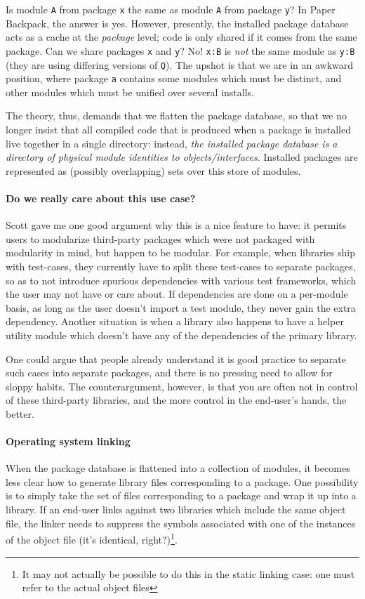 \documentclass{article}
\begin{document}
Is module \verb|A| from package \verb|x| the same as module \verb|A|
from package \verb|y|?  In Paper Backpack, the answer is yes.
However, presently, the installed package database acts as a cache at the \emph{package}
level; code is only shared if it comes from the same package.  Can we share
packages \verb|x| and \verb|y|? No!
\verb|x:B| is \emph{not} the same module as \verb|y:B| (they are using differing
versions of \verb|Q|).  The upshot is that we are in an awkward position,
where package \verb|a| contains some modules which must be distinct, and other
modules which must be unified over several installs.

The theory, thus, demands that we flatten the package database, so that
we no longer insist that all compiled code that is produced when a
package is installed live together in a single directory: instead,
\emph{the installed package database is a directory of physical module
identities to objects/interfaces}.  Installed packages are represented
as (possibly overlapping) sets over this store of modules.

\paragraph{Do we really care about this use case?}  Scott gave me one
good argument why this is a nice feature to have: it permits users to
modularize third-party packages which were not packaged with modularity
in mind, but happen to be modular.  For example, when libraries ship
with test-cases, they currently have to split these test-cases to separate
packages, so as to not introduce spurious dependencies with various
test frameworks, which the user may not have or care about.  If dependencies
are done on a per-module basis, as long as the user doesn't import a test
module, they never gain the extra dependency.  Another situation is when
a library also happens to have a helper utility module which doesn't have
any of the dependencies of the primary library.

One could argue that people already understand it is good practice to
separate such cases into separate packages, and there is no pressing
need to allow for sloppy habits.  The counterargument, however, is that
you are often not in control of these third-party libraries, and the
more control in the end-user's hands, the better.

\paragraph{Operating system linking}  When the package database is flattened
into a collection of modules, it becomes less clear how to generate library
files corresponding to a package.  One possibility is to simply take the
set of files corresponding to a package and wrap it up into a library.
If an end-user links against two libraries which include the same object file,
the linker needs to suppress the symbols associated with one of the instances
of the object file (it's identical, right?)\footnote{It may not actually be
possible to do this in the static linking case: one must refer to the actual object
files}.
\end{document}
